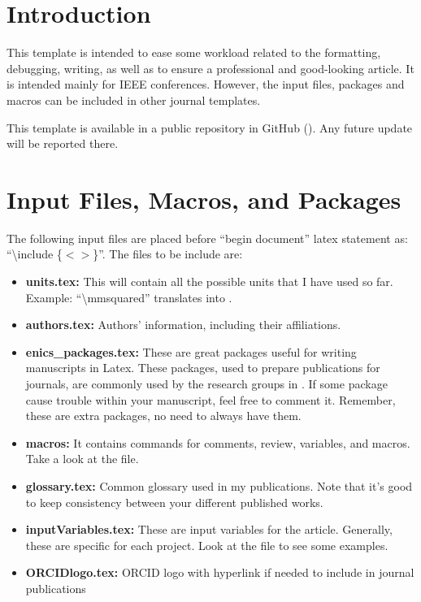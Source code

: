 \documentclass[conference]{IEEEtran}
\begin{document}
\section{Introduction}\label{introduction}
This template is intended to ease some workload related to the formatting, debugging, writing, as well as to ensure a professional and good-looking article. 
It is intended mainly for IEEE conferences.
However, the input files, packages and macros can be included in other journal templates.

This template is available in a public repository in GitHub (\href{https://github.com/EstebanJGC/IEEE-Conference-Template---GZ.git}{}).
Any future update will be reported there.

\section{Input Files, Macros, and Packages}
The following input files are placed before ``begin document'' latex statement as: ``\textbackslash include \{$<$$>$\}''. 
The files to be include are:
\begin{itemize}
    \item \textbf{units.tex:} This will contain all the possible units that I have used so far. Example: ``\textbackslash mmsquared'' translates into \mmsquared.
    \item \textbf{authors.tex:} Authors' information, including their affiliations.
    \item \textbf{enics\_packages.tex:} These are great packages useful for writing manuscripts in Latex. These packages, used to prepare publications for journals, are commonly used by the research groups in \hyperlink{https://enicslabs.com/}{}.
    If some package cause trouble within your manuscript, feel free to comment it. Remember, these are extra packages, no need to always have them. 
    \item \textbf{macros:} It contains commands for comments, review, variables, and macros. Take a look at the file.
    \item \textbf{glossary.tex:} Common glossary used in my publications. Note that it's good to keep consistency between your different published works.
    \item \textbf{inputVariables.tex:} These are input variables for the article.
    Generally, these are specific for each project.
    Look at the file to see some examples.
    \item \textbf{ORCIDlogo.tex:} ORCID logo with hyperlink if needed to include in journal publications
\end{itemize}
\end{document}
